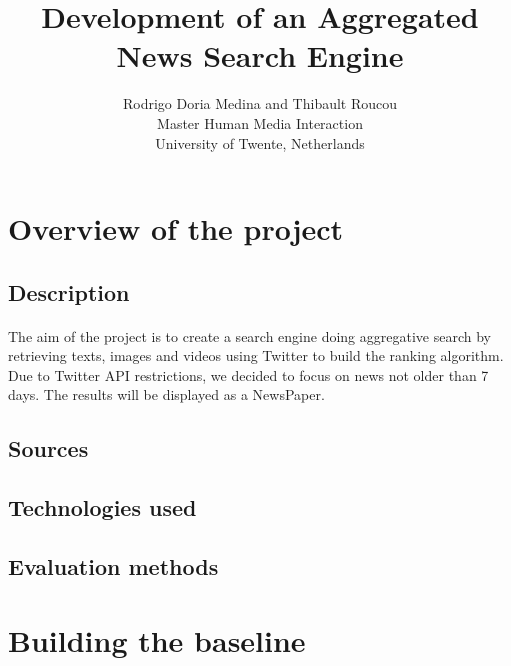 \documentclass[10pt, a4paper]{article}
\title{Development of an Aggregated News Search Engine}           %
\author{Rodrigo Doria Medina and Thibault Roucou \\ Master Human Media Interaction \\ University of Twente, Netherlands}
\begin{document}
\maketitle                  %
                              
\begin{abstract}




\end{abstract}	

\section{Overview of the project}

\subsection{Description}
\paragraph{}The aim of the project is to create a search engine doing aggregative search by retrieving texts, images and videos using Twitter to build the ranking algorithm. Due to Twitter API restrictions, we decided to focus on news not older than 7 days. The results will be displayed as a NewsPaper.

\subsection{Sources}

\subsection{Technologies used}

\subsection{Evaluation methods}



\section{Building the baseline}
\end{document}
